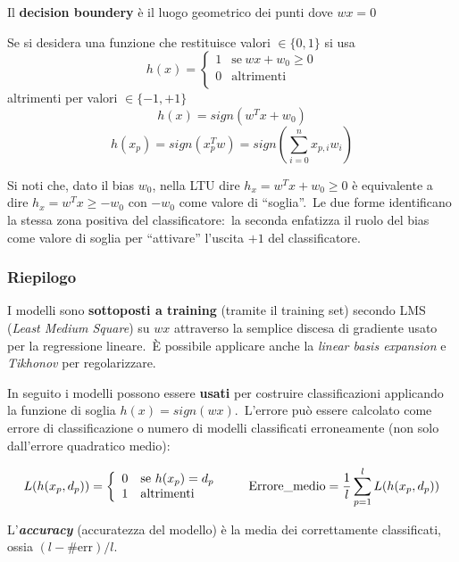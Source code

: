 \begin{definition}
	Il \textbf{decision boundery} è il luogo geometrico dei punti dove $wx=0$
\end{definition}

\noindent Se si desidera una funzione che restituisce valori $\in \{0,1\}$ si usa
\[h(x) = \left\{ \begin{array}{ll}
		1 & \mathrm{se}\  wx + w_0 \geq 0 \\
		0 & \mathrm{altrimenti}           \\
	\end{array} \right.\]
altrimenti per valori $\in \{-1,+1\}$
\[h(x) = sign(w^Tx + w_0)\]
\[ h(x_p) = sign (x_p^Tw) = sign \left( \sum_{i=0}^n x_{p,i}w_i\right) \]

\noindent Si noti che, dato il bias $w_0$, nella LTU dire $h_x = w^T x + w_0 \geq 0$ è equivalente a dire $h_x = w^T x \geq - w_0$ con $-w_0$ come valore di ``soglia''.\
Le due forme identificano la stessa zona positiva del classificatore:\ la seconda enfatizza il ruolo del bias come valore di soglia per ``attivare'' l'uscita $+1$ del classificatore.

\subsubsection{Riepilogo}

I modelli sono \textbf{sottoposti a training} (tramite il training set) secondo LMS (\textit{Least Medium Square}) su $wx$ attraverso la semplice discesa di gradiente usato per la regressione lineare.\
È possibile applicare anche la \textit{linear basis expansion} e \textit{Tikhonov} per regolarizzare.\

In seguito i modelli possono essere \textbf{usati} per costruire classificazioni applicando la funzione di soglia $h(x) = sign(wx)$.\
L'errore può essere calcolato come errore di classificazione o numero di modelli classificati erroneamente (non solo dall'errore quadratico medio):

\[L(h(x_p, d_p)) = \left\{\begin{array}{l l}
		0 & \mathrm{se}\ h(x_p) = d_p \\
		1 & \mathrm{altrimenti}
	\end{array}\right.
	\qquad \mathrm{Errore\_medio} = \frac{1}{l} \sum_{p=1}^l L(h(x_p, d_p)) \]

\begin{definition}
	L'\textbf{\textit{accuracy}} (accuratezza del modello) è la media dei correttamente classificati, ossia  $(l -\#\mathrm{err})/l$.\
\end{definition}

